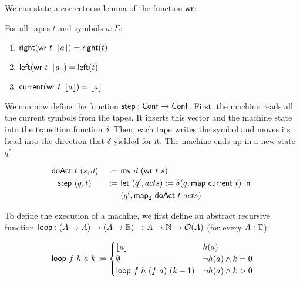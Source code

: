 We can state a correctness lemma of the function $\MS{wr}$:

\begin{fact}[Correctness of $\MS{wr}$]
  \label{lem:write}
  For all tapes $t$ and symbols $a:\Sigma$:
  \begin{enumerate}
  \item $\mathsf{right}   (\mathsf{wr}~t~\left\lfloor {a} \right\rfloor) = \mathsf{right}(t)$
  \item $\mathsf{left}    (\mathsf{wr}~t~\left\lfloor {a} \right\rfloor) = \mathsf{left} (t)$
  \item $\mathsf{current} (\mathsf{wr}~t~\left\lfloor {a} \right\rfloor) = \left\lfloor {a} \right\rfloor$
  \end{enumerate}
\end{fact}

We can now define the function $\mathsf{step} : \mathsf{Conf} \rightarrow \mathsf{Conf}$.  First, the machine reads all the current symbols from the tapes.  It inserts this
vector and the machine state into the transition function $\delta$.  Then, each tape writes the symbol and moves its head into the direction that
$\delta$ yielded for it.  The machine ends up in a new state $q'$.

\begin{definition}[$\MS{step}$][step]
  \label{def:step}
  \begin{alignat*}{2}
    \mathsf{doAct} &~t~(s, d) &~:=~& \mathsf{mv}~d~(\mathsf{wr}~t~s) \\
    \mathsf{step}  &~(q, t)   &~:=~& \mathsf{let}~(q', acts) := \delta(q, \mathsf{map}~\mathsf{current}~t)~\mathsf{in}~ \\
               &          &~  ~& (q', \mathsf{map}_2~\mathsf{doAct}~t~acts)
  \end{alignat*}
\end{definition}

To define the execution of a machine, we first define an abstract recursive function
$\mathsf{loop} : (A \rightarrow A) \rightarrow (A \rightarrow \mathbb{B}) \rightarrow A \rightarrow \mathbb{N} \rightarrow \mathcal{O}(A)$ (for every $A:\mathbb{T}$):

\begin{definition}[$\Loop$][loop]
  \begin{align*}
    \mathsf{loop}~f~h~a~k :=
    \begin{cases}
      \left\lfloor {a} \right\rfloor               & h(a) \\
      \emptyset                  & \lnot h(a) \land k = 0 \\
      \mathsf{loop}~f~h~(f~a)~(k-1)  & \lnot h(a) \land k > 0
    \end{cases}
  \end{align*}
\end{definition}

